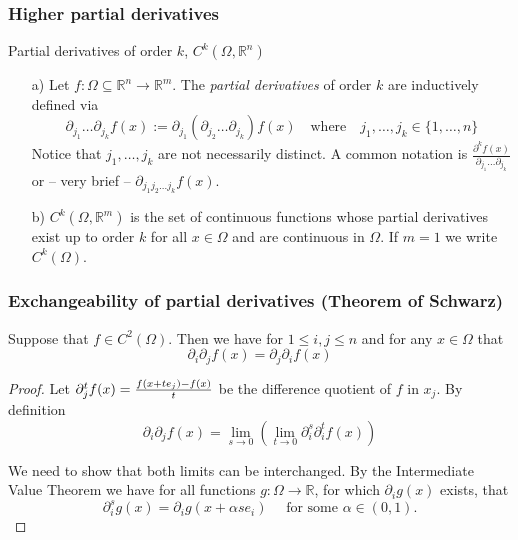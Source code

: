  \begin{frame}[fragile] \frametitle{Higher partial derivatives}
Partial derivatives of order  $k$, 
  $C^k(\Omega, \mathbb{R}^n)$

\begin{itemize}
\item[a)]
  Let $f\colon \Omega \subseteq \mathbb{R}^n \rightarrow \mathbb{R}^m$. 
  The \emph{partial derivatives} of order $k$ 
  are inductively defined via
  \[ \partial_{j_1} \ldots \partial_{j_k} f(x) 
  := \partial_{j_1} (\partial_{j_2} \ldots \partial_{j_k}) f(x) 
  \quad \text{where} \quad j_1, \ldots, j_k \in \{ 1, \ldots, n \}\]
  Notice that $j_1, \ldots, j_k$ are not necessarily distinct.
  A common notation is
   $\frac{ \partial^k f(x)}{ \partial_{j_1}\ldots \partial_{j_k}} $ or 
   -- very brief -- $\partial_{j_1 j_2 \ldots j_k} f(x)$. 

\item[b)]
  $C^k(\Omega, \mathbb{R}^m)$ is the set of continuous functions whose
  partial derivatives exist up to order $k$ for all $x \in \Omega$
  and are continuous in $\Omega$.
  If $m=1$ we write $C^k(\Omega)$.
  \end{itemize}


\end{frame}


 \begin{frame}[fragile] \frametitle{Exchangeability of partial derivatives (Theorem of Schwarz)}

  Suppose that  $f \in C^2(\Omega)$. Then we have for  $1 \le i,j \le n$ and for any $x \in \Omega$
  that
  \[\partial_i \partial_j f(x) = \partial_j \partial_i f(x)\]

\begin{proof} 
Let
   $\partial_j^t f(x) = {f(x+t e_j) - f(x) \over t}$
be the difference quotient of 
  $f$ in $x_j$.
  By definition
  \[\partial_i \partial_j f(x) 
  = \lim_{s \rightarrow 0} (\lim_{t \rightarrow 0} \partial_i^s \partial_i^t f(x))\]
  
  We need to show that both limits can be interchanged.
  By the Intermediate Value Theorem we have for all functions
   $g\colon \Omega \rightarrow \mathbb{R}$, 
  for which $\partial_i g(x)$ exists, that
  \[\partial_i^s g(x) = \partial_i g(x+\alpha s e_i) 
  \quad \text{ for some } \alpha \in (0,1).\]
  
  
\end{proof}



\end{frame}

